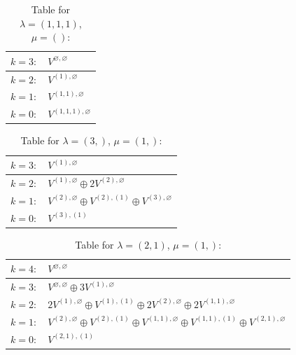 \renewcommand{\arraystretch}{1.6} 
\begin{table}[H]
\centering
\caption{Table for $\lambda = (1, 1, 1)$, $\mu = ()$:}
\begin{tabular}{|>{\centering\arraybackslash}p{15cm}|}
\hline
 $k = 3: \quad V^{\varnothing, \varnothing} $ \\ \hline
 $k = 2: \quad V^{(1), \varnothing} $ \\ \hline
 $k = 1: \quad V^{(1, 1), \varnothing} $ \\ \hline
 $k = 0: \quad V^{(1, 1, 1), \varnothing} $ \\ \hline
\end{tabular}
\end{table}

\renewcommand{\arraystretch}{1.6} 
\begin{table}[H]
\centering
\caption{Table for $\lambda = (3,)$, $\mu = (1,)$:}
\begin{tabular}{|>{\centering\arraybackslash}p{15cm}|}
\hline
 $k = 3: \quad V^{(1), \varnothing} $ \\ \hline
 $k = 2: \quad V^{(1), \varnothing} \oplus 2 V^{(2), \varnothing} $ \\ \hline
 $k = 1: \quad V^{(2), \varnothing} \oplus V^{(2), (1)} \oplus V^{(3), \varnothing} $ \\ \hline
 $k = 0: \quad V^{(3), (1)} $ \\ \hline
\end{tabular}
\end{table}

\renewcommand{\arraystretch}{1.6} 
\begin{table}[H]
\centering
\caption{Table for $\lambda = (2, 1)$, $\mu = (1,)$:}
\begin{tabular}{|>{\centering\arraybackslash}p{15cm}|}
\hline
 $k = 4: \quad V^{\varnothing, \varnothing} $ \\ \hline
 $k = 3: \quad V^{\varnothing, \varnothing} \oplus 3 V^{(1), \varnothing} $ \\ \hline
 $k = 2: \quad 2 V^{(1), \varnothing} \oplus V^{(1), (1)} \oplus 2 V^{(2), \varnothing} \oplus 2 V^{(1, 1), \varnothing} $ \\ \hline
 $k = 1: \quad V^{(2), \varnothing} \oplus V^{(2), (1)} \oplus V^{(1, 1), \varnothing} \oplus V^{(1, 1), (1)} \oplus V^{(2, 1), \varnothing} $ \\ \hline
 $k = 0: \quad V^{(2, 1), (1)} $ \\ \hline
\end{tabular}
\end{table}

